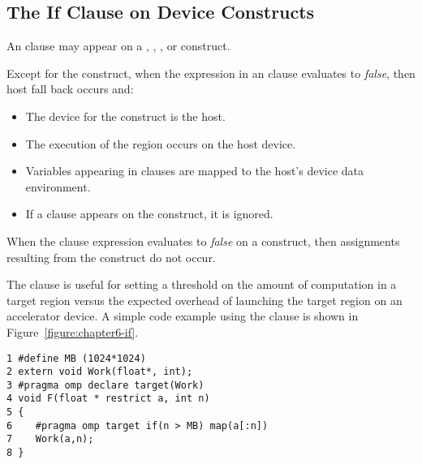 \subsection{The If Clause on Device Constructs}
\label{ssec:06.if-clause}

An  clause
may appear on a , , ,
 or  construct.  

Except for the  construct, when the expression in an
 clause evaluates to \emph{false}, then host fall back occurs and: 
\begin{itemize} 
\item The device for the construct is the host.  
\item The execution of the region occurs on the host device.
\item Variables appearing in  clauses are mapped to the host's device data environment.
\item If a  clause appears on the construct, it is ignored. 
\end{itemize}

When the  clause expression evaluates to \emph{false} on a
 construct, then assignments resulting from the construct
do not occur.

The 
clause is useful for setting a threshold on the amount of computation in a
target region versus the expected overhead of launching the target region on an
accelerator device.  A simple code example using the  clause is shown
in Figure~\ref{figure:chapter6-if}.

\begin{figure*}[!tb]
\begin{verbatim}
1 #define MB (1024*1024)
2 extern void Work(float*, int);
3 #pragma omp declare target(Work)
4 void F(float * restrict a, int n)
5 {
6    #pragma omp target if(n > MB) map(a[:n])
7    Work(a,n);
8 }
\end{verbatim}
\caption{ \textbf {Example of an if clause on the target construct} -- \small
          If \texttt{n} is greater than a threshold, execute the target region on the
          default accelerator.  Otherwise, execute the region on the host device.
         }
\label{figure:chapter6-if}
\end{figure*}

